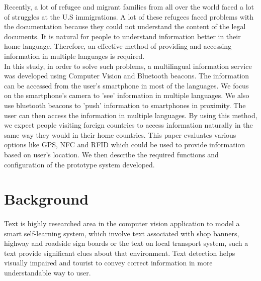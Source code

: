 \documentclass[12pt]{article}
\begin{document}
Recently, a lot of refugee and migrant families from all over the world faced a lot of struggles at the U.S immigrations. A lot of these refugees faced problems with the documentation because they could not understand the content of the legal documents. It is natural for people to understand information better in their home language. Therefore, an effective method of providing and accessing information in multiple languages is required. \\

In this study, in order to solve such problems, a multilingual information service was developed using Computer Vision and Bluetooth beacons. The information can be accessed from the user's smartphone in most of the languages. We focus on the smartphone's camera to 'see' information in multiple languages. We also use bluetooth beacons to 'push' information to smartphones in proximity. The user can then access the information in multiple languages. By using this method, we expect people visiting foreign countries to access information naturally in the same way they would in their home countries. This paper evaluates various options like GPS, NFC and RFID which could be used to provide information based on user's location. We then describe the required functions and configuration of the prototype system developed. \\




\section{Background}
\label{sect-background}

\paragraph{}Text is highly researched area in the computer vision application to model a smart self-learning system, which involve text associated with shop banners, highway and roadside sign boards or the text on local transport system, such a text provide significant clues about that environment. Text detection helps visually impaired and tourist to convey correct information in more understandable way to user.
\end{document}
